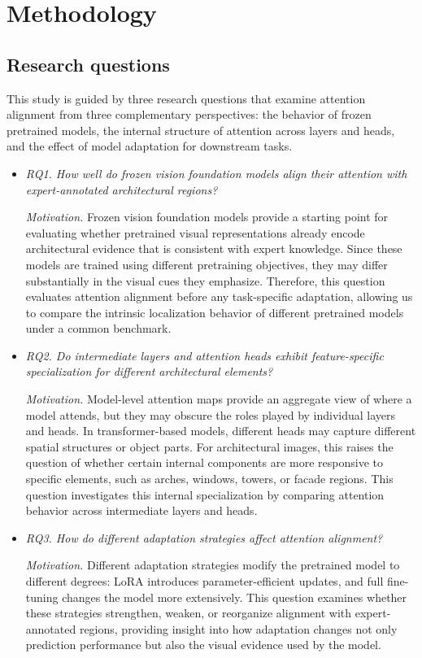 \documentclass[lineno,pdflatex,sn-mathphys-num]{sn-jnl}%
\theoremstyle{thmstyleone}%
\theoremstyle{thmstyletwo}%
\theoremstyle{thmstylethree}%
\begin{document}
\section{Methodology} \label{section proposed approach}

\subsection{Research questions}

This study is guided by three research questions that examine attention alignment from three complementary perspectives: the behavior of frozen pretrained models, the internal structure of attention across layers and heads, and the effect of model adaptation for downstream tasks.

\begin{itemize}
\item \textit{RQ1. How well do frozen vision foundation models align their attention with expert-annotated architectural regions?}

\textit{Motivation.} Frozen vision foundation models provide a starting point for evaluating whether pretrained visual representations already encode architectural evidence that is consistent with expert knowledge. Since these models are trained using different pretraining objectives, they may differ substantially in the visual cues they emphasize. Therefore, this question evaluates attention alignment before any task-specific adaptation, allowing us to compare the intrinsic localization behavior of different pretrained models under a common benchmark.

\item \textit{RQ2. Do intermediate layers and attention heads exhibit feature-specific specialization for different architectural elements?}

\textit{Motivation.} Model-level attention maps provide an aggregate view of where a model attends, but they may obscure the roles played by individual layers and heads. In transformer-based models, different heads may capture different spatial structures or object parts. For architectural images, this raises the question of whether certain internal components are more responsive to specific elements, such as arches, windows, towers, or facade regions. This question investigates this internal specialization by comparing attention behavior across intermediate layers and heads.
\item \textit{RQ3. How do different adaptation strategies affect attention alignment?}

\textit{Motivation.} Different adaptation strategies modify the pretrained model to different degrees: LoRA introduces parameter-efficient updates, and full fine-tuning changes the model more extensively. This question examines whether these strategies strengthen, weaken, or reorganize alignment with expert-annotated regions, providing insight into how adaptation changes not only prediction performance but also the visual evidence used by the model.
\end{itemize}
\end{document}
